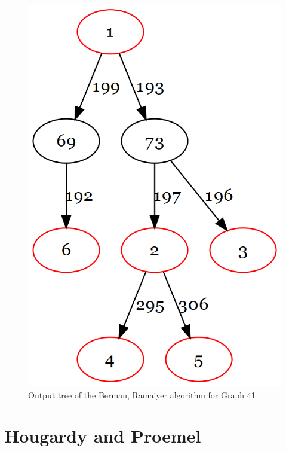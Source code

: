 \begin{figure}[htbp]
\centering
\includegraphics[scale=0.25]{figures/BermanRamaiyer.png}
\caption{Output tree of the Berman, Ramaiyer algorithm for Graph 41}\label{fig:BeRaTree41}
\end{figure}

\section{Hougardy and Proemel}

